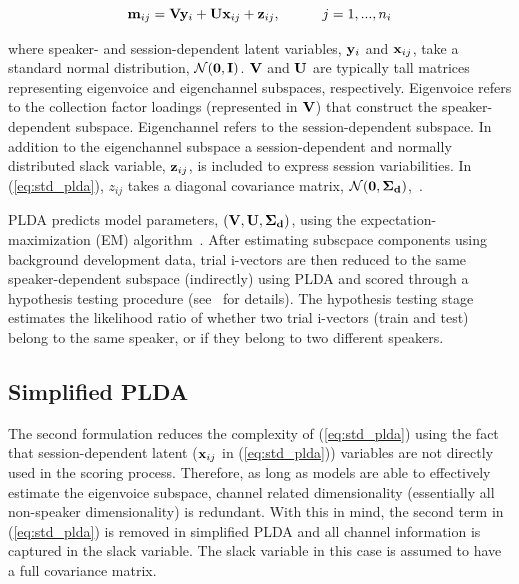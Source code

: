 \documentclass[journal]{IEEEtran}
\begin{document}
\begin{equation}
\label{eq:std_plda}
{\bf m}_{ij} = {\bf V}{\bf y}_i+{\bf U}{\bf x}_{ij}+{\bf z}_{ij},  \hspace{30pt} j=1,...,n_i
\end{equation}

where speaker- and session-dependent latent variables, ${\bf y}_i$ and ${\bf x}_{ij}$, take a standard normal distribution, $\mathcal{N}({\bf 0},{\bf I})$. ${\bf V}$ and ${\bf U}$ are typically tall matrices representing eigenvoice and eigenchannel subspaces, respectively. Eigenvoice refers to the collection factor loadings (represented in ${\bf V}$) that construct the speaker-dependent subspace. Eigenchannel refers to the session-dependent subspace. 
In addition to the eigenchannel subspace a session-dependent and normally distributed slack variable, ${\bf z}_{ij}$, is included to express session variabilities. In (\ref{eq:std_plda}), $z_{ij}$ takes a diagonal covariance matrix, $\mathcal{N}({\bf 0},{\bf \Sigma_d})$,~\cite{kenny_plda,prince_plda}. 

PLDA predicts model parameters, $({\bf V},{\bf U},{\bf \Sigma_d})$, using the expectation-maximization (EM) algorithm~\cite{prince_plda}. 
After estimating subscpace components using background development data, trial i-vectors are then reduced to the same speaker-dependent subspace (indirectly) using PLDA and scored through a hypothesis testing procedure (see~\cite{prince_plda} for details). 
The hypothesis testing stage estimates the likelihood ratio of whether two trial i-vectors (train and test) belong to the same speaker, or if they belong to two different speakers. 

\subsection{Simplified PLDA}
\label{ssec:simplified_plda}
The second formulation reduces the complexity of (\ref{eq:std_plda}) using the fact that session-dependent latent (${\bf x}_{ij}$ in (\ref{eq:std_plda})) variables are not directly used in the scoring process. 
Therefore, as long as models are able to effectively estimate the eigenvoice subspace, channel related dimensionality (essentially all non-speaker dimensionality) is redundant. 
With this in mind, the second term in (\ref{eq:std_plda}) is removed in simplified PLDA and all channel information is captured in the slack variable. 
The slack variable in this case is assumed to have a full covariance matrix.
\end{document}
